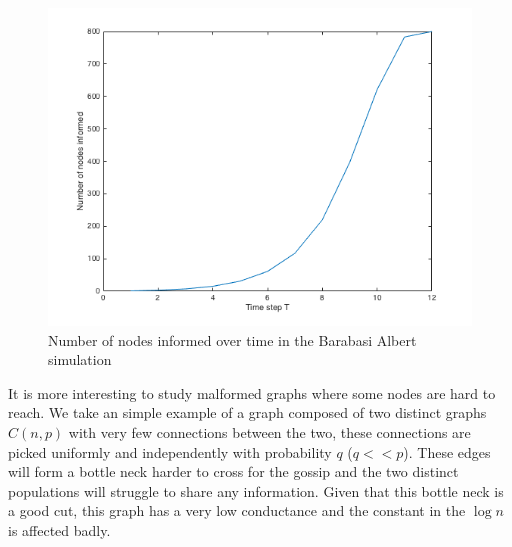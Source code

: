 \documentclass[10pt,journal,a4paper]{IEEEtran}
\begin{document}
\begin{figure}[h]
\centering
\includegraphics[width=1\linewidth]{figs/barabasi-albert-chart}
\caption{Number of nodes informed over time in the Barabasi Albert simulation}
\label{fig:barabasi-albert-chart}
\end{figure}

It is more interesting to study malformed graphs where some nodes are hard to reach. We take an simple example of a graph composed of two distinct graphs $C(n,p)$ with very few connections between the two, these connections are picked  uniformly and independently with probability $q$ ($q << p$). These edges will form a bottle neck harder to cross for the gossip and the two distinct populations will struggle to share any information. Given that this bottle neck is a good cut, this graph has a very low conductance and the constant in the $\log n$ is affected badly. 
\end{document}
